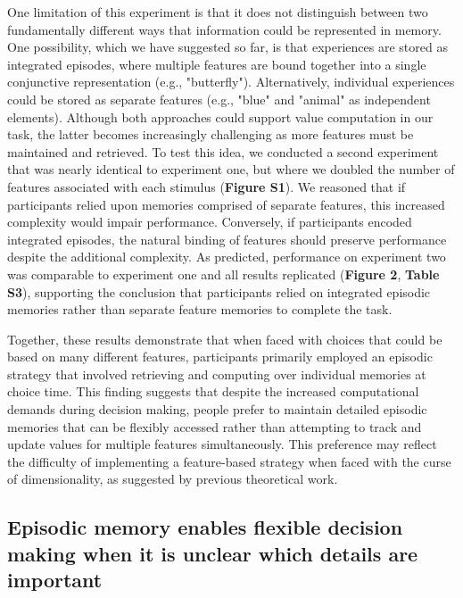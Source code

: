 \documentclass[10pt,letterpaper]{article}
\begin{document}
One limitation of this experiment is that it does not distinguish between two fundamentally different ways that information could be represented in memory. One possibility, which we have suggested so far, is that experiences are stored as integrated episodes, where multiple features are bound together into a single conjunctive representation (e.g., "butterfly")\cite{oreillyHippocampalConjunctiveEncoding1994, oreillyConjunctiveRepresentationsLearning}. Alternatively, individual experiences could be stored as separate features (e.g., "blue" and "animal" as independent elements)\cite{rudyConjunctiveRepresentationsHippocampus2001}. Although both approaches could support value computation in our task, the latter becomes increasingly challenging as more features must be maintained and retrieved. To test this idea, we conducted a second experiment that was nearly identical to experiment one, but where we doubled the number of features associated with each stimulus (\textbf{Figure S1}). We reasoned that if participants relied upon memories comprised of separate features, this increased complexity would impair performance. Conversely, if participants encoded integrated episodes, the natural binding of features should preserve performance despite the additional complexity. As predicted, performance on experiment two was comparable to experiment one and all results replicated (\textbf{Figure 2}, \textbf{Table S3}), supporting the conclusion that participants relied on integrated episodic memories rather than separate feature memories to complete the task.

Together, these results demonstrate that when faced with choices that could be based on many different features, participants primarily employed an episodic strategy that involved retrieving and computing over individual memories at choice time. This finding suggests that despite the increased computational demands during decision making, people prefer to maintain detailed episodic memories that can be flexibly accessed rather than attempting to track and update values for multiple features simultaneously. This preference may reflect the difficulty of implementing a feature-based strategy when faced with the curse of dimensionality, as suggested by previous theoretical work\cite{gershmanReinforcementLearningEpisodic2017}.

\subsection{Episodic memory enables flexible decision making when it is unclear which details are important}
\end{document}
